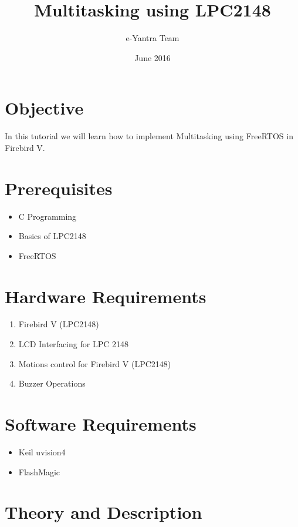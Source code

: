 \documentclass{article}
\begin{document}
\begin{titlepage}


\title{Multitasking using LPC2148}
\author{e-Yantra Team}
\date{June 2016}
\maketitle
\end{titlepage}




\listoffigures
\tableofcontents
\newpage
\section{Objective}
In this tutorial we will learn how to implement Multitasking using FreeRTOS in Firebird V.
\vspace{3mm}

\section{Prerequisites}
\begin{itemize}
    \item C Programming
    \item Basics of LPC2148
    \item FreeRTOS
\end{itemize}

\section{Hardware Requirements}
\begin{enumerate}
    \item Firebird V (LPC2148)
    \item LCD Interfacing for LPC 2148
    \item Motions control for Firebird V (LPC2148)
    \item Buzzer Operations
\end{enumerate}

\section{Software Requirements}
\begin{itemize}
    \item Keil uvision4
    \item FlashMagic
\end{itemize}

\section{Theory and Description}
\end{document}
